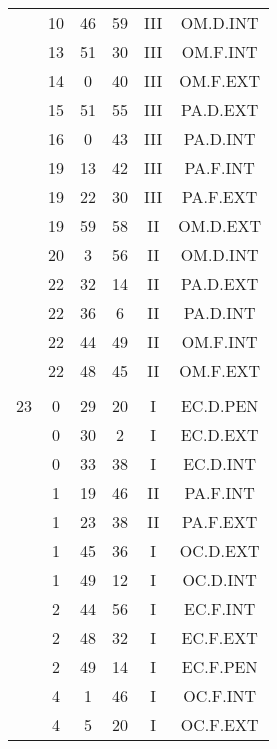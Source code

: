 \documentclass[12pt, a4paper]{article}
\begin{document}
\begin{multicols}{3}
{\begin{tabular}{c c c c c c}
	 	 	 	 & 10 & 46 & 59 & III & OM.D.INT\\%
	 	 	 	 & 13 & 51 & 30 & III & OM.F.INT\\%
	 	 	 	 & 14 & 0 & 40 & III & OM.F.EXT\\%
	 	 	 	 & 15 & 51 & 55 & III & PA.D.EXT\\%
	 	 	 	 & 16 & 0 & 43 & III & PA.D.INT\\%
	 	 	 	 & 19 & 13 & 42 & III & PA.F.INT\\%
	 	 	 	 & 19 & 22 & 30 & III & PA.F.EXT\\%
	 	 	 	 & 19 & 59 & 58 & II & OM.D.EXT\\%
	 	 	 	 & 20 & 3 & 56 & II & OM.D.INT\\%
	 	 	 	 & 22 & 32 & 14 & II & PA.D.EXT\\%
	 	 	 	 & 22 & 36 & 6 & II & PA.D.INT\\%
	 	 	 	 & 22 & 44 & 49 & II & OM.F.INT\\%
	 	 	 	 & 22 & 48 & 45 & II & OM.F.EXT\\%
	 	 	 	 & & & & & \\%
	 	 	 	23 & 0 & 29 & 20 & I & EC.D.PEN\\%
	 	 	 	 & 0 & 30 & 2 & I & EC.D.EXT\\%
	 	 	 	 & 0 & 33 & 38 & I & EC.D.INT\\%
	 	 	 	 & 1 & 19 & 46 & II & PA.F.INT\\%
	 	 	 	 & 1 & 23 & 38 & II & PA.F.EXT\\%
	 	 	 	 & 1 & 45 & 36 & I & OC.D.EXT\\%
	 	 	 	 & 1 & 49 & 12 & I & OC.D.INT\\%
	 	 	 	 & 2 & 44 & 56 & I & EC.F.INT\\%
	 	 	 	 & 2 & 48 & 32 & I & EC.F.EXT\\%
	 	 	 	 & 2 & 49 & 14 & I & EC.F.PEN\\%
	 	 	 	 & 4 & 1 & 46 & I & OC.F.INT\\%
	 	 	 	 & 4 & 5 & 20 & I & OC.F.EXT\\%
	 	 \end{tabular}
 	}
\end{multicols}
\end{document}
